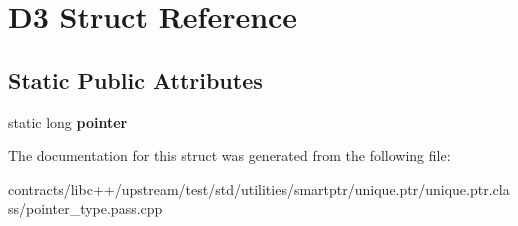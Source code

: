 \hypertarget{struct_d3}{}\section{D3 Struct Reference}
\label{struct_d3}
\subsection*{Static Public Attributes}
\begin{DoxyCompactItemize}
\item 
\mbox{\label{struct_d3_a5586e13e4efb89719cadd7317b01e8b9}} 
static long {\bfseries pointer}
\end{DoxyCompactItemize}


The documentation for this struct was generated from the following file\+:\begin{DoxyCompactItemize}
\item 
contracts/libc++/upstream/test/std/utilities/smartptr/unique.\+ptr/unique.\+ptr.\+class/pointer\+\_\+type.\+pass.\+cpp\end{DoxyCompactItemize}
